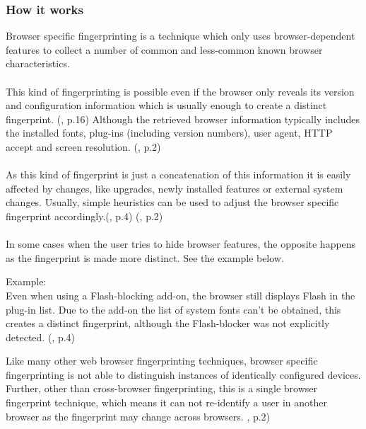 \subsubsection{How it works}
Browser specific fingerprinting is a technique which only uses browser-dependent features to collect a number of common and less-common known browser characteristics.\\\\
This kind of fingerprinting is possible even if the browser only reveals its version and configuration information which is usually enough to create a distinct fingerprint. (\textcite{eckersley10}, p.16) Although the retrieved browser information typically includes the installed fonts, plug-ins (including version numbers), user agent, HTTP accept and screen resolution. (\textcite{upi15}, p.2)\\\\
As this kind of fingerprint is just a concatenation of this information it is easily affected by changes, like upgrades, newly installed features or external system changes.
Usually, simple heuristics can be used to adjust the browser specific fingerprint accordingly.(\textcite{eckersley10}, p.4) (\textcite{upi15}, p.2)\\\\
In some cases when the user tries to hide browser features, the opposite happens as the fingerprint is made more distinct. See the example below.\\
\begin{tcolorbox}
	Example: \\
	Even when using a Flash-blocking add-on, the browser still displays Flash in the plug-in list. Due to the add-on the list of system fonts can't be obtained, this creates a distinct fingerprint, although the Flash-blocker was not explicitly detected. (\textcite{eckersley10}, p.4)
\end{tcolorbox}
Like many other web browser fingerprinting techniques, browser specific fingerprinting is not able to distinguish instances of identically configured devices. Further, other than cross-browser fingerprinting, this is a single browser fingerprint technique, which means it can not re-identify a user in another browser as the fingerprint may change across browsers. \textcite{upi15}, p.2)

